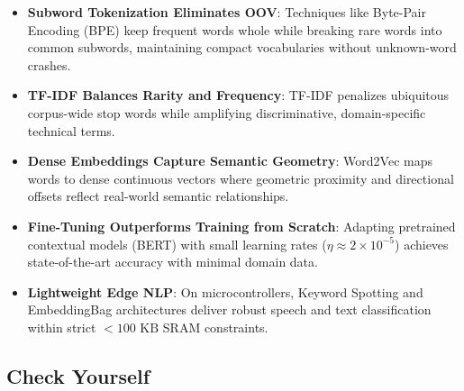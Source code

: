 \begin{takeaways}
\begin{itemize}
    \item \textbf{Subword Tokenization Eliminates OOV}: Techniques like Byte-Pair Encoding (BPE) keep frequent words whole while breaking rare words into common subwords, maintaining compact vocabularies without unknown-word crashes.
    \item \textbf{TF-IDF Balances Rarity and Frequency}: TF-IDF penalizes ubiquitous corpus-wide stop words while amplifying discriminative, domain-specific technical terms.
    \item \textbf{Dense Embeddings Capture Semantic Geometry}: Word2Vec maps words to dense continuous vectors where geometric proximity and directional offsets reflect real-world semantic relationships.
    \item \textbf{Fine-Tuning Outperforms Training from Scratch}: Adapting pretrained contextual models (BERT) with small learning rates ($\eta \approx 2 \times 10^{-5}$) achieves state-of-the-art accuracy with minimal domain data.
    \item \textbf{Lightweight Edge NLP}: On microcontrollers, Keyword Spotting and EmbeddingBag architectures deliver robust speech and text classification within strict $<100\text{ KB}$ SRAM constraints.
\end{itemize}
\end{takeaways}

\subsection{Check Yourself}\label{subsec:check_yourself}

